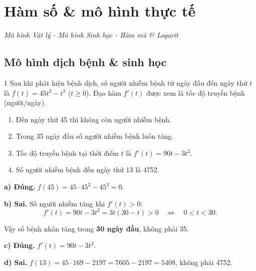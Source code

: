 
\chapter{Hàm số \& mô hình thực tế}
\begin{center}
  \textit{\color{ForumDarkGray}Mô hình Vật lý - Mô hình Sinh học - Hàm mũ \& Logarit}
\end{center}

\section{Mô hình dịch bệnh \& sinh học}

\begin{baitoan}{1 \hfill {}}
Sau khi phát hiện bệnh dịch, số người nhiễm bệnh từ ngày đầu đến ngày thứ $t$ là $f(t) = 45t^2 - t^3$ ($t \ge 0$). Đạo hàm $f'(t)$ được xem là tốc độ truyền bệnh (người/ngày).

\begin{enumerate}[label=\alph*), leftmargin=2em]
  \item Đến ngày thứ 45 thì không còn người nhiễm bệnh.
  \item Trong 35 ngày đầu số người nhiễm bệnh luôn tăng.
  \item Tốc độ truyền bệnh tại thời điểm $t$ là $f'(t) = 90t - 3t^2$.
  \item Số người nhiễm bệnh đến ngày thứ 13 là 4752.
\end{enumerate}
\end{baitoan}

\begin{loigiai}
\textbf{a) Đúng.} $f(45) = 45 \cdot 45^2 - 45^3 = 0$.

\textbf{b) Sai.} Số người nhiễm tăng khi $f'(t) > 0$:
\[ f'(t) = 90t - 3t^2 = 3t(30 - t) > 0 \quad \Leftrightarrow \quad 0 < t < 30. \]

Vậy số bệnh nhân tăng trong \textbf{30 ngày đầu}, không phải 35.


\textbf{c) Đúng.} $f'(t) = 90t - 3t^2$.

\textbf{d) Sai.} $f(13) = 45 \cdot 169 - 2197 = 7605 - 2197 = \boxed{5408}$, không phải 4752.
\end{loigiai}

